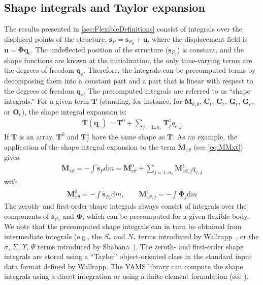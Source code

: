 \documentclass[wes, manuscript]{copernicus}
\renewcommand{\d}{\mathrm{d}}
\renewcommand{\v}[1]{\boldsymbol{#1}}
\newcommand{\m}[1]{\boldsymbol{#1}}
\newcommand{\s}{\v{s}}
\renewcommand{\d}{\mathrm{d}}
\newcommand{\dm}{\d{m}}
\begin{document}
\subsection{Shape integrals and Taylor expansion}
\label{sec:TaylorExpansionShapeIntegrals}
The results presented in \autoref{sec:FlexibleDefinitions} consist of integrals over the displaced points of the structure, $\v{s}_P=\s_{P_0} + \v{u}$, where the displacement field is $\v{u}=\m{\Phi} \v{q}_e$. The undeflected position of the structure ($\v{s}_{P_0}$) is constant, and the shape functions are known at the initialization; the only time-varying terms are the degrees of freedom $\v{q}_e$. Therefore, the integrals can be precomputed terms by decomposing them into a constant part and a part that is linear with respect to the degrees of freedom $\v{q}_e$. The precomputed integrals are referred to as ``shape integrals.'' For a given term $\v{T}$ (standing, for instance, for $\m{M}_{\theta,\theta}$, $\m{C}_t$, $\m{C}_r$, $\v{G}_r$, $\v{G}_e$, or $\v{O}_e$), the shape integral expansion is:
\begin{align}
\m{T}(\v{q}_e) = \m{T}^0 
    + \sum\limits_{j=1..n_e} \m{T}^1_j q_{e,j}
    \label{eq:T01}
\end{align}
If $\m{T}$ is an array, $\m{T}^0$ and $\m{T}^1_j$ have the same shape as $\m{T}$.
As an example, the application of the shape integral expansion to the term $\m{M}_{x\theta}$ (see \autoref{eq:MMxt}) gives:
\begin{align}
   \m{M}_{x\theta}=-\int \tilde{\v{s}}_P \dm =  \m{M}_{x\theta}^0 +\sum\limits_{j=1..n_e}     {\m{M}_{x\theta,j}^1} q_{e,j}
\end{align}
with
\begin{align}
    \m{M}_{x\theta}^0 = -\int \tilde{\v{s}}_{P_0} \dm 
        ,\qquad
    \m{M}_{x\theta,j}^1 = -\int \tilde{\v{\Phi}}_j \dm 
\end{align}
The zeroth- and first-order shape integrals always consist of integrals over the components of $\s_{P_0}$ and $\m{\Phi}$, which can be precomputed for a given flexible body.
We note that the precomputed shape integrals can in turn be obtained from intermediate integrals (e.g., the $S_*$ and $N_*$ terms introduced by Wallrapp~\citep{Wallrapp:1994}, or the $\sigma$, $\Sigma$, $\Upsilon$, $\Psi$ terms introduced by Shabana~\citep{shabana:book}).  
The zeroth- and first-order shape integrals are stored using a ``Taylor'' object-oriented class in the standard input data format defined by Wallrapp. The YAMS library can compute the shape integrals using a direct integration or using a finite-element formulation (see \cite{Schwertassek:book}).
\end{document}
